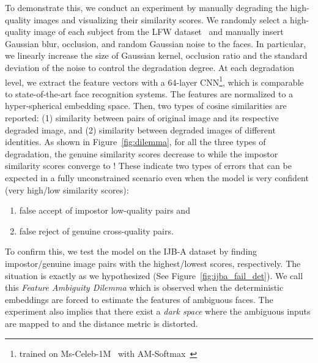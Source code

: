 \documentclass[10pt,twocolumn,letterpaper]{article}
\begin{document}
To demonstrate this, we conduct an experiment by manually degrading the high-quality images and visualizing their similarity scores. We randomly select a high-quality image of each subject from the LFW dataset~\cite{LFWTech} and manually insert Gaussian blur, occlusion, and random Gaussian noise to the faces. In particular, we linearly increase the size of Gaussian kernel, occlusion ratio and the standard deviation of the noise to control the degradation degree. At each degradation level, we extract the feature vectors with a 64-layer CNN\footnote{trained on Ms-Celeb-1M~\cite{MS-CELEB} with AM-Softmax~\cite{wang2018additive}}, which is comparable to state-of-the-art face recognition systems. The features are normalized to a hyper-spherical embedding space. Then, two types of cosine similarities are reported: (1) similarity between pairs of original image and its respective degraded image, and (2) similarity between degraded images of different identities. As shown in Figure~\ref{fig:dilemma}, for all the three types of degradation, the genuine similarity scores decrease to  while the impostor similarity scores converge to ! These indicate two types of errors that can be expected in a fully unconstrained  scenario even when the model is very confident (very high/low similarity scores): 
\begin{enumerate}[leftmargin=20pt,label={(\arabic*)}]\vspace{-0.5em}
    \item false accept of impostor low-quality pairs and\vspace{-0.5em}
    \item false reject of genuine cross-quality pairs.\vspace{-0.4em}
\end{enumerate}
To confirm this, we test the model on the IJB-A dataset by finding impostor/genuine image pairs with the highest/lowest scores, respectively. The situation is exactly as we hypothesized (See Figure~\ref{fig:ijba_fail_det}). We call this \textit{Feature Ambiguity Dilemma} which is observed when the deterministic embeddings are forced to estimate the features of ambiguous faces. The experiment also implies that there exist a \textit{dark space} where the ambiguous inputs are mapped to and the distance metric is distorted. 
\end{document}
